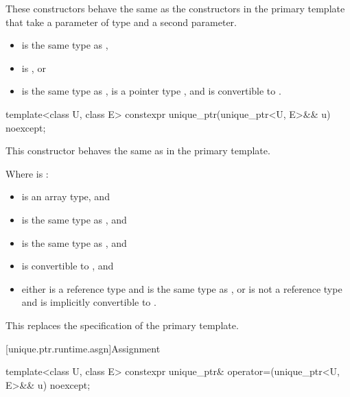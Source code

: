 \begin{itemdescr}
\pnum
These constructors behave the same as
the constructors in the primary template that
take a parameter of type  and a second parameter.

\pnum
\constraints
\begin{itemize}
\item {} is the same type as ,
\item {} is , or
\item {} is the same type as ,
       is a pointer type , and
       is convertible to .
\end{itemize}
\end{itemdescr}

%
\begin{itemdecl}
template<class U, class E> constexpr unique_ptr(unique_ptr<U, E>&& u) noexcept;
\end{itemdecl}

\begin{itemdescr}
\pnum
This constructor behaves the same as in the primary template.

\pnum
\constraints
Where  is :
\begin{itemize}
\item {} is an array type, and
\item {} is the same type as , and
\item {} is the same type as , and
\item {} is convertible to , and
\item either  is a reference type and  is the same type as ,
      or  is not a reference type and  is implicitly convertible to .
\end{itemize}

\begin{note}
This replaces the \constraints specification of the primary template.
\end{note}
\end{itemdescr}

[unique.ptr.runtime.asgn]{Assignment}

%
\begin{itemdecl}
template<class U, class E> constexpr unique_ptr& operator=(unique_ptr<U, E>&& u) noexcept;
\end{itemdecl}


